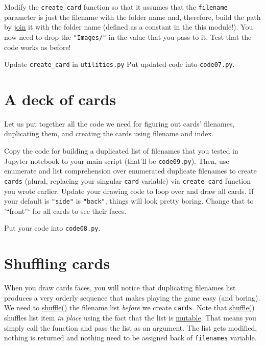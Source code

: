\documentclass[
]{book}
\begin{document}
Modify the \texttt{create\_card} function so that it assumes that the \texttt{filename} parameter is just the filename with the folder name and, therefore, build the path by \href{https://docs.python.org/3/library/os.path.html\#os.path.join}{join} it with the folder name (defined as a constant in the this module!). You now need to drop the \texttt{"Images/"} in the value that you pass to it. Test that the code works as before!

Update \texttt{create\_card} in \texttt{utilities.py}
Put updated code into \texttt{code07.py}.

\hypertarget{a-deck-of-cards}{%
\section{A deck of cards}\label{a-deck-of-cards}}

Let us put together all the code we need for figuring out cards' filenames, duplicating them, and creating the cards using filename and index.

Copy the code for building a duplicated list of filenames that you tested in Jupyter notebook to your main script (that'll be \texttt{code09.py}). Then, use enumerate and list comprehension over enumerated duplicate filenames to create \texttt{cards} (plural, replacing your singular \texttt{card} variable) via \texttt{create\_card} function you wrote earlier. Update your drawing code to loop over and draw all cards. If your default is \texttt{"side"} is \texttt{"back"}, things will look pretty boring. Change that to '``front''` for all cards to see their faces.

Put your code into \texttt{code08.py}.

\hypertarget{shuffle}{%
\section{Shuffling cards}\label{shuffle}}

When you draw cards faces, you will notice that duplicating filenames list produces a very orderly sequence that makes playing the game easy (and boring). We need to \href{https://docs.python.org/3/library/random.html\#random.shuffle}{shuffle()} the filename list \emph{before} we create \texttt{cards}. Note that \href{https://docs.python.org/3/library/random.html\#random.shuffle}{shuffle()} shuffles list item \emph{in place} using the fact that the list is \protect\hyperlink{mutable-objects}{mutable}. That means you simply call the function and pass the list as an argument. The list gets modified, nothing is returned and nothing need to be assigned back of \texttt{filenames} variable.
\end{document}
